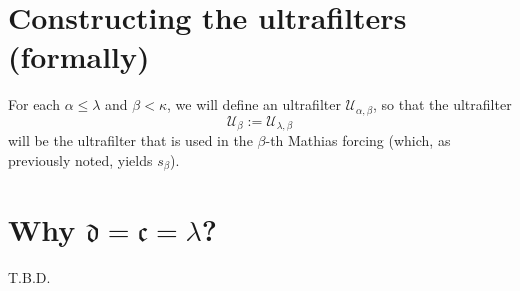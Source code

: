 \documentclass[12pt]{article}\usepackage[english]{babel}
\newcommand{\calU}{\mathcal{U}}
\newcommand{\continuum}{\mathfrak{c}}
\newcommand{\domnumber}{\mathfrak{d}}
\theoremstyle{definition}
\theoremstyle{remark}
\begin{document}
\newpage

\section*{Constructing the ultrafilters (formally)}

For each $\alpha \leq \lambda$ and $\beta < \kappa$, we will define an ultrafilter $\calU_{\alpha, \beta}$, so that the ultrafilter
\[
  \calU_\beta := \calU_{\lambda, \beta}
\]
will be the ultrafilter that is used in the $\beta$-th Mathias forcing (which, as previously noted, yields $s_\beta$).
\section*{Why $\domnumber = \continuum = \lambda$?}

T.B.D.

\newpage



\end{document}
